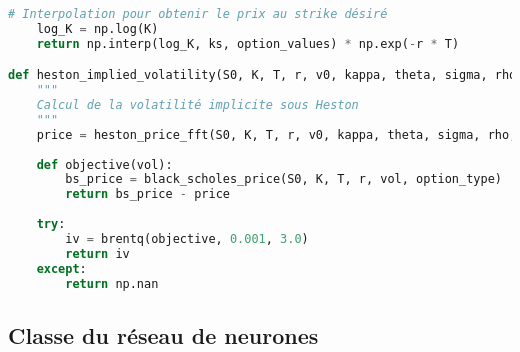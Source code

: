 \begin{lstlisting}[language=Python, caption=Implémentation du pricing Heston]
    # Interpolation pour obtenir le prix au strike désiré
    log_K = np.log(K)
    return np.interp(log_K, ks, option_values) * np.exp(-r * T)

def heston_implied_volatility(S0, K, T, r, v0, kappa, theta, sigma, rho, option_type='call'):
    """
    Calcul de la volatilité implicite sous Heston
    """
    price = heston_price_fft(S0, K, T, r, v0, kappa, theta, sigma, rho, option_type)
    
    def objective(vol):
        bs_price = black_scholes_price(S0, K, T, r, vol, option_type)
        return bs_price - price
    
    try:
        iv = brentq(objective, 0.001, 3.0)
        return iv
    except:
        return np.nan
\end{lstlisting}

\subsection{Classe du réseau de neurones}

